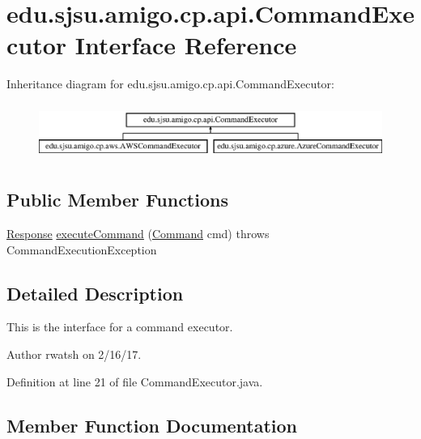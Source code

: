 \hypertarget{interfaceedu_1_1sjsu_1_1amigo_1_1cp_1_1api_1_1_command_executor}{}\section{edu.\+sjsu.\+amigo.\+cp.\+api.\+Command\+Executor Interface Reference}
\label{interfaceedu_1_1sjsu_1_1amigo_1_1cp_1_1api_1_1_command_executor}
Inheritance diagram for edu.\+sjsu.\+amigo.\+cp.\+api.\+Command\+Executor\+:\begin{figure}[H]
\begin{center}
\leavevmode
\includegraphics[height=1.860465cm]{interfaceedu_1_1sjsu_1_1amigo_1_1cp_1_1api_1_1_command_executor}
\end{center}
\end{figure}
\subsection*{Public Member Functions}
\begin{DoxyCompactItemize}
\item 
\hyperlink{classedu_1_1sjsu_1_1amigo_1_1cp_1_1api_1_1_response}{Response} \hyperlink{interfaceedu_1_1sjsu_1_1amigo_1_1cp_1_1api_1_1_command_executor_af1e217a4347a1f1e8e2d0d465b94a662}{execute\+Command} (\hyperlink{classedu_1_1sjsu_1_1amigo_1_1cp_1_1api_1_1_command}{Command} cmd)  throws Command\+Execution\+Exception
\end{DoxyCompactItemize}


\subsection{Detailed Description}
This is the interface for a command executor.

\begin{DoxyAuthor}{Author}
rwatsh on 2/16/17. 
\end{DoxyAuthor}


Definition at line 21 of file Command\+Executor.\+java.



\subsection{Member Function Documentation}
\mbox{\label{interfaceedu_1_1sjsu_1_1amigo_1_1cp_1_1api_1_1_command_executor_af1e217a4347a1f1e8e2d0d465b94a662}} 
